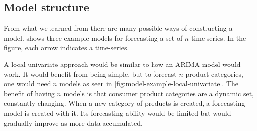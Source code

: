 \subsection{Model structure}


From what we learned from 
there are many possible ways of constructing a model.
 shows three example-models for forecasting a set of $n$ time-series.
In the figure, each arrow indicates a time-series.

A local univariate approach would be similar to how an ARIMA model would work.
It would benefit from being simple, but to forecast $n$ product categories,
one would need $n$ models as seen in \cref{fig:model-example-local-univariate}.
The benefit of having $n$ models is that consumer product categories are a dynamic set, constantly changing.
When a new category of products is created, a forecasting model is created with it. Its forecasting ability
would be limited but would gradually improve as more data accumulated.

